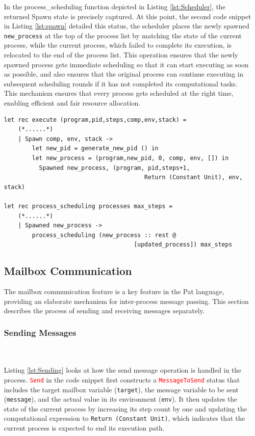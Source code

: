 \documentclass{l4proj}
\begin{document}
In the process\_scheduling function depicted in Listing \ref{lst:Scheduler}, the returned Spawn state is precisely captured. At this point, the second code snippet in Listing \ref{lst:spawn} detailed this status, the scheduler places the newly spawned \texttt{new\_process} at the top of the process list by matching the state of the current process, while the current process, which failed to complete its execution, is relocated to the end of the process list. This operation ensures that the newly spawned process gets immediate scheduling so that it can start executing as soon as possible, and also ensures that the original process can continue executing in subsequent scheduling rounds if it has not completed its computational tasks. This mechanism ensures that every process gets scheduled at the right time, enabling efficient and fair resource allocation.

\noindent\begin{minipage}{\linewidth}
\lstset{style=Ocamlstyle,}
\begin{lstlisting}[caption={Process spawning mechanism in Pat}, label={lst:spawn}]
let rec execute (program,pid,steps,comp,env,stack) =
    (*......*)
    | Spawn comp, env, stack ->
        let new_pid = generate_new_pid () in
        let new_process = (program,new_pid, 0, comp, env, []) in
          Spawned new_process, (program, pid,steps+1, 
                                        Return (Constant Unit), env, stack)

let rec process_scheduling processes max_steps =
    (*......*)
    | Spawned new_process -> 
        process_scheduling (new_process :: rest @ 
                                     [updated_process]) max_steps

\end{lstlisting}
\end{minipage}

\subsection{Mailbox Communication}
The mailbox communication feature is a key feature in the Pat language, providing an elaborate mechanism for inter-process message passing. This section describes the process of sending and receiving messages separately. 
\vspace{1\baselineskip} 
\subsubsection{Sending Messages} \hfill\\\\
Listing \ref{lst:Sending} looks at how the send message operation is handled in the process. \textcolor{red}{\texttt{Send}} in the code snippet first constructs a \textcolor{red}{\texttt{MessageToSend}} status that includes the target mailbox variable (\texttt{target}), the message variable to be sent (\texttt{message}), and the actual value in its environment (\texttt{env}). It then updates the state of the current process by increasing its step count by one and updating the computational expression to \texttt{Return (Constant Unit)}, which indicates that the current process is expected to end its execution path.
\end{document}
